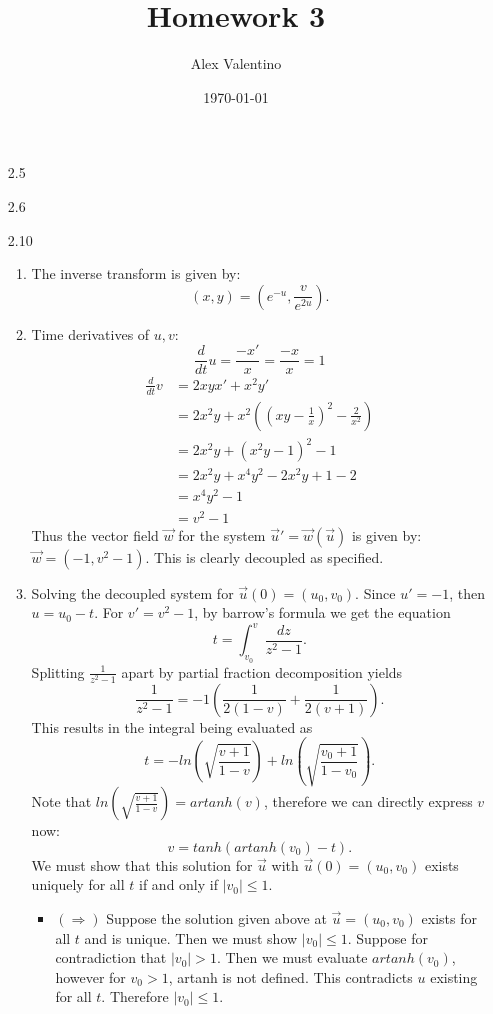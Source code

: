 \documentclass[12pt, letterpaper]{article}
\date{\today}
\author{Alex Valentino}
\title{Homework 3}
\begin{document}
\begin{enumerate}
	\item[2.5]
	\item[2.6]
	\item[2.10]
	\begin{enumerate}
		\item The inverse transform is given by:
		$$
		(x,y) = (e^{-u}, \frac{v}{e^{2u}}).
		$$
		\item Time derivatives of $u,v$:
			$$
				\frac{d}{dt}u = \frac{-x'}{x} = \frac{-x}{x} = 1                                                                              
			$$
			\begin{align*}
			\frac{d}{dt}v &= 2xy x' + x^2 y'\\
			&= 2x^2 y + x^2((xy-\frac{1}{x})^2 -\frac{2}{x^2})\\	
			&= 2x^2 y + (x^2y -1)^2 - 1\\
			&= 2x^2 y + x^4y^2 -2x^2y + 1 - 2\\
			&= x^4y^2 -1\\
			&= v^2 - 1
			\end{align*}
			Thus the vector field $\vec{w}$ for the system $\Vec{u}' = \Vec{w}(\Vec{u})$ is given by:
			$\Vec{w} = (-1,v^2 -1)$.  This is clearly decoupled as specified.
		\item Solving the decoupled system for $\Vec{u}(0) = (u_0,v_0)$.  
			Since $u' = -1$, then $u = u_0 - t.$  For $v' = v^2 - 1$, by barrow's formula we get the equation
			$$
				t = \int_{v_0}^v \frac{dz}{z^2 - 1}.		
			$$
			Splitting $\frac{1}{z^2 - 1}$ apart by partial fraction decomposition yields
			$$
				\frac{1}{z^2 - 1} = -1 (\frac{1}{2(1-v)} + \frac{1}{2(v+1)}).
			$$
			This results in the integral being evaluated as 
			$$
				t = -ln(\sqrt{\frac{v+1}{1-v}}) + ln(\sqrt{\frac{v_0+1}{1-v_0}}).			
			$$
			Note that $ln\left(\sqrt{\frac{v+1}{1-v}}\right) = artanh(v)$, therefore we can directly express $v$ now:
			$$
				v = tanh(artanh(v_0) - t).			
			$$
			We must show that this solution for $\Vec{u}$ with $\Vec{u}(0) = (u_0,v_0)$ exists uniquely for all $t$ if and only if $|v_0| \leq 1$.
			\begin{itemize}
				\item $(\Rightarrow)$  Suppose the solution given above at $\Vec{u} = (u_0, v_0)$ exists for all $t$ and is unique.  Then we must show $|v_0| \leq 1$.  Suppose for contradiction that $|v_0| > 1$.  Then we must evaluate $artanh(v_0)$, however for $v_0>1$, artanh is not defined.  This contradicts $u$ existing for all $t$.  Therefore $|v_0| \leq 1$.

\end{itemize}
\end{enumerate}
\end{enumerate}
\end{document}
